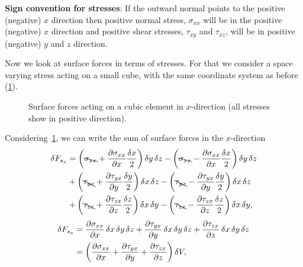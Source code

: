 \textbf{Sign convention for stresses}: If the outward normal points to the positive (negative) $x$ direction then positive normal stress, \(\sigma_{xx}\) will be in the positive (negative) $x$ direction and positive shear stresses, \(\tau_{xy}\) and \(\tau_{xz}\), will be in positive (negative) $y$ and $z$ direction.

Now we look at surface forces in terms of stresses.
For that we consider a space varying stress acting on a small cube, with the same coordinate system as before (\cref{fig:cubic-fluid-element-stress-x-direction}).
%
\begin{figure}[ht]
	\begin{center}
	\end{center}
	\caption{Surface forces acting on a cubic element in \(x\)-direction (all stresses show in positive direction).}\label{fig:cubic-fluid-element-stress-x-direction}
\end{figure}
%
Considering~\cref{fig:cubic-fluid-element-stress-x-direction}, we can write the sum of surface forces in the \(x\)-direction
%
\begin{equation}
	\begin{aligned}
		\deltaop F_{s_x}
		 & =
		\left(\bcancel{\sigma_{xx}} + \f{\p \sigma_{xx}}{\p x} \f{\deltaop x}{2}\right) \deltaop y \deltaop z
		- \left(\bcancel{\sigma_{xx}} - \f{\p \sigma_{xx}}{\p x} \f{\deltaop x}{2}\right) \deltaop y \deltaop z      \\
		 & + \left(\bcancel{\tau_{yx}}    + \f{\p \tau_{yx}}{\p y}    \f{\deltaop y}{2}\right) \deltaop x \deltaop z
		- \left(\bcancel{\tau_{yx}}    - \f{\p \tau_{yx}}{\p y}    \f{\deltaop y}{2}\right) \deltaop x \deltaop z    \\
		 & + \left(\bcancel{\tau_{zx}}    + \f{\p \tau_{zx}}{\p z}    \f{\deltaop z}{2}\right) \deltaop x \deltaop y
		- \left(\bcancel{\tau_{zx}}    - \f{\p \tau_{zx}}{\p z}    \f{\deltaop z}{2}\right) \deltaop x \deltaop y,
	\end{aligned}
	\label{eq:sum-of-surface-forces-x-dir}
\end{equation}
%
\begin{equation}
	\begin{aligned}
		\deltaop F_{s_x}
		 & =
		\f{\p \sigma_{xx}}{\p x} \deltaop x \deltaop y \deltaop z
		+ \f{\p \tau_{yx}}{\p y} \deltaop x \deltaop y \deltaop z
		+ \f{\p \tau_{zx}}{\p z} \deltaop x \deltaop y \deltaop z \\
		 & =
		\left(\f{\p \sigma_{xx}}{\p x} + \f{\p \tau_{yx}}{\p y} + \f{\p \tau_{zx}}{\p z}\right) \deltaop V,
	\end{aligned}
	\label{eq:sum-of-surface-forces-x-dir-cancelled}
\end{equation}
